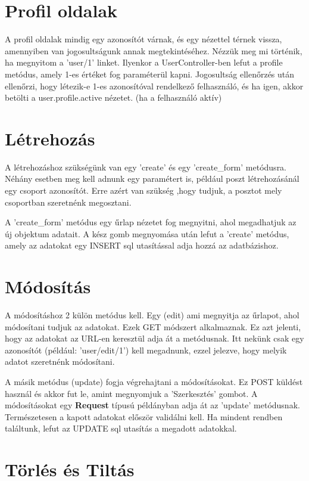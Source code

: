 \documentclass[
]{thesis-ekf}
\theoremstyle{definition}
\theoremstyle{remark}
\begin{document}
\section{Profil oldalak}

A profil oldalak mindig egy azonosítót várnak, és egy nézettel térnek vissza, amennyiben van jogosultságunk annak megtekintéséhez. Nézzük meg mi történik, ha megnyitom a 'user/1' linket. Ilyenkor a UserController-ben lefut a profile metódus, amely 1-es értéket fog paraméterül kapni.
Jogosultság ellenőrzés után ellenőrzi, hogy létezik-e 1-es azonosítóval rendelkező felhasználó, és ha igen, akkor betölti a user.profile.active nézetet. (ha a felhasználó aktív)

\section{Létrehozás}

A létrehozáshoz szükségünk van egy 'create' és egy 'create\_form' metódusra. Néhány esetben meg kell adnunk egy paramétert is, például poszt létrehozásánál egy csoport azonosítót. Erre azért van szükség ,hogy tudjuk, a posztot mely csoportban szeretnénk megosztani.

A 'create\_form' metódus egy űrlap nézetet fog megnyitni, ahol megadhatjuk az új objektum adatait. A kész gomb megnyomása után lefut a 'create' metódus, amely az adatokat egy INSERT sql utasítással adja hozzá az adatbázishoz.

\section{Módosítás}

A módosításhoz 2 külön metódus kell. Egy (edit) ami megnyitja az űrlapot, ahol módosítani tudjuk az adatokat. Ezek GET módszert alkalmaznak. Ez azt jelenti, hogy az adatokat az URL-en keresztül adja át a metódusnak.
Itt nekünk csak egy azonosítót (például: 'user/edit/1') kell megadnunk, ezzel jelezve, hogy melyik adatot szeretnénk módosítani.

A másik metódus (update) fogja végrehajtani a módosításokat. Ez POST küldést használ és akkor fut le, amint megnyomjuk a 'Szerkesztés' gombot. A módosításokat egy \textbf{Request} típusú példányban adja át az 'update' metódusnak. Természetesen a kapott adatokat először validálni kell. Ha mindent rendben találtunk, lefut az UPDATE sql utasítás a megadott adatokkal.

\section{Törlés és Tiltás}
\end{document}
